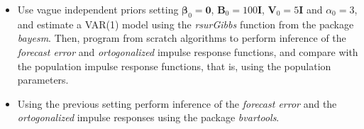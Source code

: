 \begin{enumerate}
\begin{itemize}
	\item  Use vague independent priors setting $\bm{\beta}_0=\bm{0}$, $\bm{B}_0=100\bm{I}$, $\bm{V}_0=5\bm{I}$ and $\alpha_0=3$, and estimate a VAR(1) model using the \textit{rsurGibbs} function from the package \textit{bayesm}. Then, program from scratch algorithms to perform inference of the \textit{forecast error} and \textit{ortogonalized} impulse response functions, and compare with the population impulse response functions, that is, using the population parameters.
	
	\item Using the previous setting perform inference of the \textit{forecast error} and the \textit{ortogonalized} impulse responses using the package \textit{bvartools}.  
\end{itemize}

	
	
\end{enumerate}
